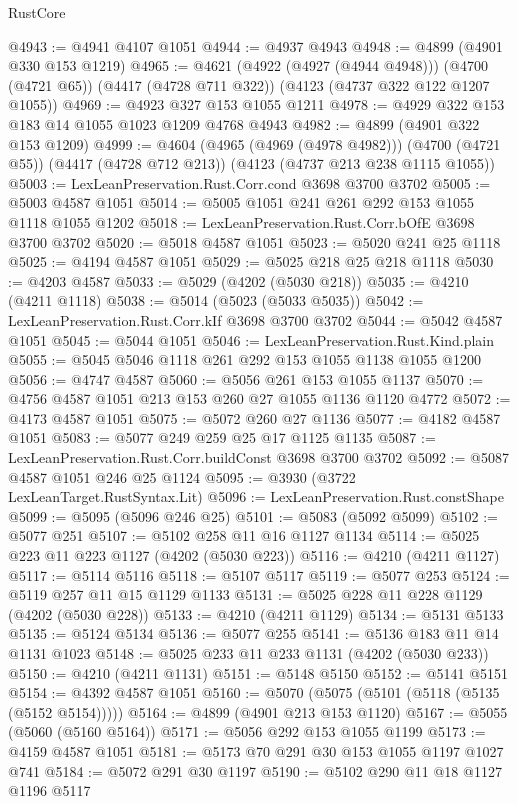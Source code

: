 \begin{lexlean}{RustCore}
\begin{coremodule}
@4943 := @4941 @4107 @1051
@4944 := @4937 @4943
@4948 := @4899 (@4901 @330 @153 @1219)
@4965 := @4621
    (@4922 (@4927 (@4944 @4948)))
    (@4700 (@4721 @65))
    (@4417 (@4728 @711 @322))
    (@4123 (@4737 @322 @122 @1207 @1055))
@4969 := @4923 @327 @153 @1055 @1211
@4978 := @4929 @322 @153 @183 @14 @1055 @1023 @1209 @4768 @4943
@4982 := @4899 (@4901 @322 @153 @1209)
@4999 := @4604
    (@4965 (@4969 (@4978 @4982)))
    (@4700 (@4721 @55))
    (@4417 (@4728 @712 @213))
    (@4123 (@4737 @213 @238 @1115 @1055))
@5003 := LexLeanPreservation.Rust.Corr.cond @3698 @3700 @3702
@5005 := @5003 @4587 @1051
@5014 := @5005 @1051 @241 @261 @292 @153 @1055 @1118 @1055 @1202
@5018 := LexLeanPreservation.Rust.Corr.bOfE @3698 @3700 @3702
@5020 := @5018 @4587 @1051
@5023 := @5020 @241 @25 @1118
@5025 := @4194 @4587 @1051
@5029 := @5025 @218 @25 @218 @1118
@5030 := @4203 @4587
@5033 := @5029 (@4202 (@5030 @218))
@5035 := @4210 (@4211 @1118)
@5038 := @5014 (@5023 (@5033 @5035))
@5042 := LexLeanPreservation.Rust.Corr.kIf @3698 @3700 @3702
@5044 := @5042 @4587 @1051
@5045 := @5044 @1051
@5046 := LexLeanPreservation.Rust.Kind.plain
@5055 := @5045 @5046 @1118 @261 @292 @153 @1055 @1138 @1055 @1200
@5056 := @4747 @4587
@5060 := @5056 @261 @153 @1055 @1137
@5070 := @4756 @4587 @1051 @213 @153 @260 @27 @1055 @1136 @1120 @4772
@5072 := @4173 @4587 @1051
@5075 := @5072 @260 @27 @1136
@5077 := @4182 @4587 @1051
@5083 := @5077 @249 @259 @25 @17 @1125 @1135
@5087 := LexLeanPreservation.Rust.Corr.buildConst @3698 @3700 @3702
@5092 := @5087 @4587 @1051 @246 @25 @1124
@5095 := @3930 (@3722 LexLeanTarget.RustSyntax.Lit)
@5096 := LexLeanPreservation.Rust.constShape
@5099 := @5095 (@5096 @246 @25)
@5101 := @5083 (@5092 @5099)
@5102 := @5077 @251
@5107 := @5102 @258 @11 @16 @1127 @1134
@5114 := @5025 @223 @11 @223 @1127 (@4202 (@5030 @223))
@5116 := @4210 (@4211 @1127)
@5117 := @5114 @5116
@5118 := @5107 @5117
@5119 := @5077 @253
@5124 := @5119 @257 @11 @15 @1129 @1133
@5131 := @5025 @228 @11 @228 @1129 (@4202 (@5030 @228))
@5133 := @4210 (@4211 @1129)
@5134 := @5131 @5133
@5135 := @5124 @5134
@5136 := @5077 @255
@5141 := @5136 @183 @11 @14 @1131 @1023
@5148 := @5025 @233 @11 @233 @1131 (@4202 (@5030 @233))
@5150 := @4210 (@4211 @1131)
@5151 := @5148 @5150
@5152 := @5141 @5151
@5154 := @4392 @4587 @1051
@5160 := @5070 (@5075 (@5101 (@5118 (@5135 (@5152 @5154)))))
@5164 := @4899 (@4901 @213 @153 @1120)
@5167 := @5055 (@5060 (@5160 @5164))
@5171 := @5056 @292 @153 @1055 @1199
@5173 := @4159 @4587 @1051
@5181 := @5173 @70 @291 @30 @153 @1055 @1197 @1027 @741
@5184 := @5072 @291 @30 @1197
@5190 := @5102 @290 @11 @18 @1127 @1196 @5117

\end{coremodule}
\end{lexlean}
